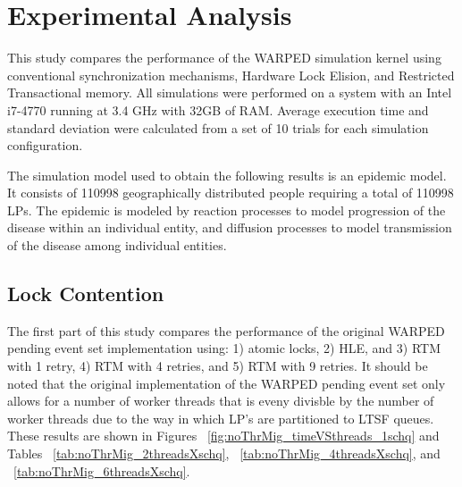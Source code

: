 \documentclass[a4paper]{article}
\begin{document}
\newpage
\section{\textbf{Experimental Analysis}}

\indent This study compares the performance of the WARPED simulation kernel
using conventional synchronization mechanisms, Hardware Lock Elision, and
Restricted Transactional memory.  All simulations were performed on a system
with an Intel i7-4770 running at 3.4 GHz with 32GB of RAM.  Average execution
time and standard deviation were calculated from a set of 10 trials for each
simulation configuration.\par

\indent The simulation model used to obtain the following results is an epidemic
model.  It consists of 110998 geographically distributed people
requiring a total of 110998 LPs.  The epidemic is modeled by reaction processes
to model progression of the disease within an individual entity, and diffusion
processes to model transmission of the disease among individual entities.\par

%

\subsection{\textbf{Lock Contention}}

\indent
The first part of this study compares the performance of the original WARPED
pending event set implementation using: 1) atomic locks, 2) HLE, and 3) RTM with
1 retry, 4) RTM with 4 retries, and 5) RTM with 9 retries.  It should be noted
that the original implementation of the WARPED pending event set only allows for
a number of worker threads that is eveny divisble by the number of worker
threads due to the way in which LP's are partitioned to LTSF queues.  These
results are shown in Figures ~\ref{fig:noThrMig_timeVSthreads_1schq} and Tables
~\ref{tab:noThrMig_2threadsXschq}, ~\ref{tab:noThrMig_4threadsXschq}, and
~\ref{tab:noThrMig_6threadsXschq}.\par
\end{document}
